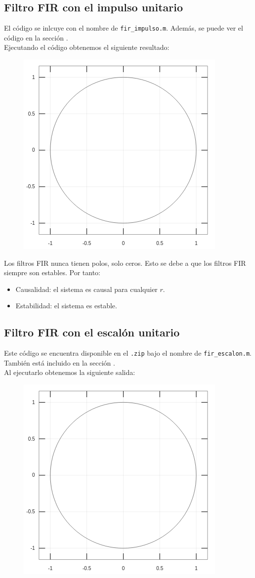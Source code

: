 \documentclass[11pt,a4paper]{article}
\begin{document}
\subsection{Filtro FIR con el impulso unitario}

El código se inlcuye con el nombre de \texttt{fir\_impulso.m}. Además, se puede ver el código en la sección \color{deepred}\color{black}.\\

Ejecutando el código obtenemos el siguiente resultado:

\begin{figure}[H]
  \centering
  \includegraphics[width=0.5\linewidth]{img/polosg4.png}
\end{figure}

Los filtros FIR nunca tienen polos, solo ceros. Esto se debe a que los filtros FIR siempre son estables. Por tanto:

\begin{itemize}
	\item Causalidad: el sistema es causal para cualquier $r$.
	\item Estabilidad: el sistema es estable.
\end{itemize}

\subsection{Filtro FIR con el escalón unitario}

Este código se encuentra disponible en el \texttt{.zip} bajo el nombre de \texttt{fir\_escalon.m}. También está incluido en la sección \color{deepred}\color{black}.\\

Al ejecutarlo obtenemos la siguiente salida:

\begin{figure}[H]
  \centering
  \includegraphics[width=0.45\linewidth]{img/polosg4.png}
\end{figure}
\end{document}
